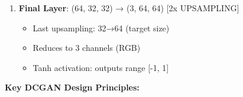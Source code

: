 \documentclass[11pt]{article}
\providecommand{\tightlist}{%
      \setlength{\itemsep}{0pt}\setlength{\parskip}{0pt}}
\begin{document}
\begin{enumerate}
  \begin{itemize}
  \tightlist
  \item
    Third upsampling: 16→32
  \item
    Channels: 128→64
  \item
    Refining features (eyes, limbs, patterns)
  \end{itemize}
\item
  \textbf{Final Layer}: (64, 32, 32) → (3, 64, 64) {[}2x UPSAMPLING{]}

  \begin{itemize}
  \tightlist
  \item
    Last upsampling: 32→64 (target size)
  \item
    Reduces to 3 channels (RGB)
  \item
    Tanh activation: outputs range {[}-1, 1{]}
  \end{itemize}
\end{enumerate}

\textbf{Key DCGAN Design Principles:}
\end{document}

